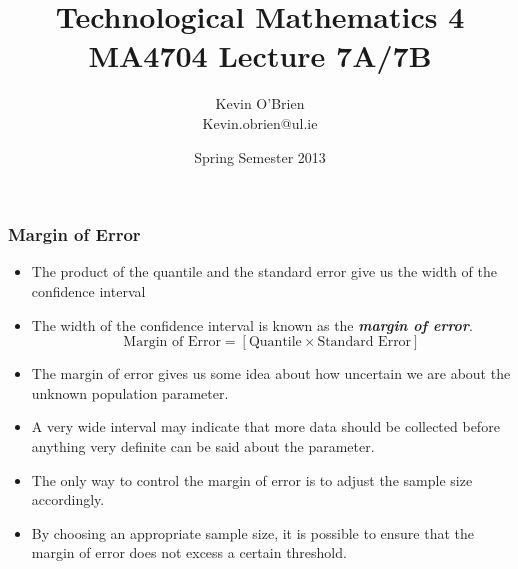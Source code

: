 \documentclass[a4]{beamer}
\title[MA4704]{Technological Mathematics 4 \\ {\normalsize MA4704 Lecture 7A/7B}}
\author[Kevin O'Brien]{Kevin O'Brien \\ {\scriptsize Kevin.obrien@ul.ie}}
\date{Spring Semester 2013}
\institute[Maths \& Stats]{Dept. of Mathematics \& Statistics, \\ University \textit{of} Limerick}
\begin{document}
\begin{frame}
\titlepage
\end{frame}
\begin{frame}
\frametitle{Margin of Error}

\begin{itemize}
\item The product of the quantile and the standard error give us the width of the confidence interval
\item The width of the confidence interval is known as the \textbf{\emph{margin of error}}.  \[ \mbox{Margin of Error}  = \left[ \mbox{Quantile} \times \mbox{Standard Error} \right] \]
\item The margin of error gives us some idea about how uncertain we are about the unknown population parameter. \item A very wide interval may indicate that more data should be collected before anything very definite can be said about the parameter.
\item The only way to control the margin of error is to adjust the sample size accordingly.
\item By choosing an appropriate sample size, it is possible to ensure that the margin of error does not excess a certain threshold.
\end{itemize}

\end{frame}

\end{document}
